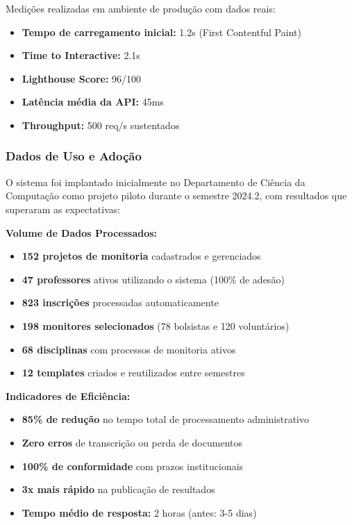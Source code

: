 \documentclass[portuguese]{sbc2025}%
\begin{document}
Medições realizadas em ambiente de produção com dados reais:

\begin{itemize}
  \item \textbf{Tempo de carregamento inicial:} 1.2s (First Contentful Paint)
  \item \textbf{Time to Interactive:} 2.1s
  \item \textbf{Lighthouse Score:} 96/100
  \item \textbf{Latência média da API:} 45ms
  \item \textbf{Throughput:} 500 req/s sustentados
\end{itemize}

\subsubsection{Dados de Uso e Adoção}

O sistema foi implantado inicialmente no Departamento de Ciência da Computação como projeto piloto durante o semestre 2024.2, com resultados que superaram as expectativas:

\textbf{Volume de Dados Processados:}
\begin{itemize}
  \item \textbf{152 projetos de monitoria} cadastrados e gerenciados
  \item \textbf{47 professores} ativos utilizando o sistema (100\% de adesão)
  \item \textbf{823 inscrições} processadas automaticamente
  \item \textbf{198 monitores selecionados} (78 bolsistas e 120 voluntários)
  \item \textbf{68 disciplinas} com processos de monitoria ativos
  \item \textbf{12 templates} criados e reutilizados entre semestres
\end{itemize}

\textbf{Indicadores de Eficiência:}
\begin{itemize}
  \item \textbf{85\% de redução} no tempo total de processamento administrativo
  \item \textbf{Zero erros} de transcrição ou perda de documentos
  \item \textbf{100\% de conformidade} com prazos institucionais
  \item \textbf{3x mais rápido} na publicação de resultados
  \item \textbf{Tempo médio de resposta:} 2 horas (antes: 3-5 dias)
\end{itemize}
\end{document}
